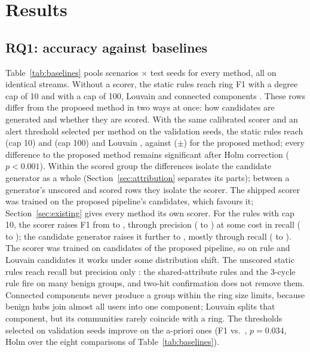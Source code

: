 \section{Results}
\label{sec:results}

\subsection{RQ1: accuracy against baselines}



Table~\ref{tab:baselines} pools \EScenarios{} scenarios $\times$ \ESeeds{}
test seeds for every method, all on identical streams. Without a scorer, the
static rules reach ring F1 \ECapTenF{} with a degree cap of 10 and
\ECapHundredF{} with a cap of 100, Louvain \ELouvainF{} and connected
components \EPlainCCF{}. These rows differ from the proposed method in two
ways at once: how candidates are generated and whether they are scored. With
the same calibrated scorer and an alert threshold selected per method on the
validation seeds, the static rules reach \ECapTenSF{} (cap 10) and
\ECapHundredSF{} (cap 100) and Louvain \ELouvainSF{}, against \EPropF{}
($\pm$\EPropFCI{}) for the proposed method; every difference to the proposed
method remains significant after Holm correction ($p<0.001$). Within the
scored group the differences isolate the candidate generator as a whole
(Section~\ref{sec:attribution} separates its parts); between a generator's
unscored and scored rows they isolate the scorer. The shipped scorer was
trained on the proposed pipeline's candidates, which favours it;
Section~\ref{sec:existing} gives every method its own scorer. For the rules with cap 10, the scorer raises F1
from \ECapTenF{} to \ECapTenSF{}, through precision (\ECapTenP{} to
\ECapTenSP{}) at some cost in recall (\ECapTenR{} to \ECapTenSR{}); the
candidate generator raises it further to \EPropF{}, mostly through recall
(\ECapTenSR{} to \EPropR{}). The scorer was trained on candidates of the proposed pipeline, so
on rule and Louvain candidates it works under some distribution shift. The
unscored static rules reach recall
\ECapTenR{} but precision only \ECapTenP{}: the shared-attribute rules and the
3-cycle rule fire on many benign groups, and two-hit confirmation does not
remove them. Connected components never produce a group within the ring size
limits, because benign hubs join almost all users into one component; Louvain
splits that component, but its communities rarely coincide with a ring. The
thresholds selected on validation seeds improve on the a-priori ones (F1
\EPropF{} vs.\ \EPropDefaultF{}, $p=0.034$, Holm over the eight comparisons
of Table~\ref{tab:baselines}).

